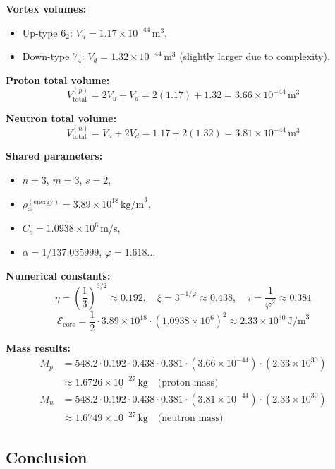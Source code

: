 \documentclass[12pt]{article}
\begin{document}
\textbf{Vortex volumes:}
\begin{itemize}
    \item Up-type \( 6_2 \): \( V_u = 1.17 \times 10^{-44} \, \text{m}^3 \),
    \item Down-type \( 7_4 \): \( V_d = 1.32 \times 10^{-44} \, \text{m}^3 \) (slightly larger due to complexity).
\end{itemize}

\textbf{Proton total volume:}
\[
V_\text{total}^{(p)} = 2V_u + V_d = 2(1.17) + 1.32 = 3.66 \times 10^{-44} \, \text{m}^3
\]

\textbf{Neutron total volume:}
\[
V_\text{total}^{(n)} = V_u + 2V_d = 1.17 + 2(1.32) = 3.81 \times 10^{-44} \, \text{m}^3
\]

\textbf{Shared parameters:}
\begin{itemize}
    \item \( n = 3 \), \( m = 3 \), \( s = 2 \),
    \item \( \rho_\text{\ae}^{(\text{energy})} = 3.89 \times 10^{18} \, \text{kg/m}^3 \),
    \item \( C_e = 1.0938 \times 10^6 \, \text{m/s} \),
    \item \( \alpha = 1/137.035999 \), \quad \( \varphi = 1.618\ldots \)
\end{itemize}

\textbf{Numerical constants:}
\[
\eta = \left(\frac{1}{3}\right)^{3/2} \approx 0.192, \quad
\xi = 3^{-1/\varphi} \approx 0.438, \quad
\tau = \frac{1}{\varphi^2} \approx 0.381
\]
\[
\mathcal{E}_\text{core} = \frac{1}{2} \cdot 3.89 \times 10^{18} \cdot (1.0938 \times 10^6)^2 \approx 2.33 \times 10^{30} \, \text{J/m}^3
\]

\textbf{Mass results:}
\begin{align*}
M_p &= 548.2 \cdot 0.192 \cdot 0.438 \cdot 0.381
\cdot (3.66 \times 10^{-44}) \cdot (2.33 \times 10^{30}) \\
&\approx \boxed{1.6726 \times 10^{-27} \, \text{kg}} \quad \text{(proton mass)} \\
M_n &= 548.2 \cdot 0.192 \cdot 0.438 \cdot 0.381
\cdot (3.81 \times 10^{-44}) \cdot (2.33 \times 10^{30}) \\
&\approx \boxed{1.6749 \times 10^{-27} \, \text{kg}} \quad \text{(neutron mass)}
\end{align*}

\subsection{Conclusion}
\end{document}
